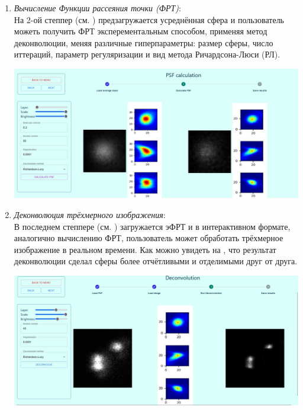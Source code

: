 \begin{enumerate}[]
\begin{minipage}{\textwidth}
	\label{fig:avg-stepper}  
	\vspace{\mfloatsep} %
\end{minipage}
\item \textit{Вычисление Функции рассеяния точки (ФРТ)}:\\
На 2-ой степпер (см. ) предзагружается усреднённая сфера и пользователь можеть получить ФРТ эксперементальным способом, применяя метод деконволюции, меняя различные гиперпараметры: размер сферы, число иттераций, параметр регуляризации и вид метода Ричардсона-Люси (РЛ).\\
\begin{minipage}{\textwidth}
	\centering
	\vspace{\mfloatsep} %
	\includegraphics[keepaspectratio=true,scale=0.4] {my_folder/images/online_service/stepper_psf.png}
	\label{fig:psf-stepper}  
	\vspace{\mfloatsep} %
\end{minipage}
\item \textit{Деконволюция трёхмерного изображения}:\\
В последнем степпере (см. ) загружается эФРТ и в интерактивном формате, аналогично вычислению ФРТ, пользователь может обработать трёхмерное изображение в реальном времени. Как можно увидеть на , что результат деконволюции сделал сферы более отчётливыми и отделимыми друг от друга. \\
\begin{minipage}{\textwidth}
	\centering
	\vspace{\mfloatsep} %
	\includegraphics[keepaspectratio=true,scale=0.3] {my_folder/images/online_service/deconvolution.png}

\end{minipage}
\end{enumerate}
